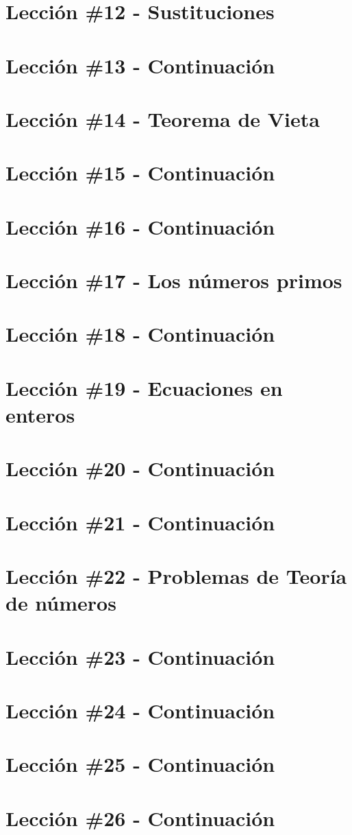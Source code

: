 \section{Lección \#12 - Sustituciones}

\section{Lección \#13 - Continuación}

\section{Lección \#14 - Teorema de Vieta}

\section{Lección \#15 - Continuación}

\section{Lección \#16 - Continuación}

\section{Lección \#17 - Los números primos}

\section{Lección \#18 - Continuación}

\section{Lección \#19 - Ecuaciones en enteros}

\section{Lección \#20 - Continuación}

\section{Lección \#21 - Continuación}

\section{Lección \#22 - Problemas de Teoría de números}

\section{Lección \#23 - Continuación}

\section{Lección \#24 - Continuación}

\section{Lección \#25 - Continuación}

\section{Lección \#26 - Continuación}